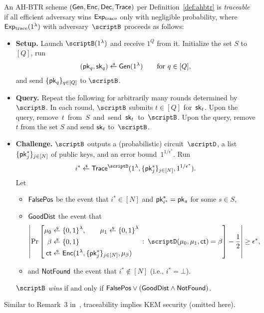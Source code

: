 \begin{definition}[traceability]\label{def:tracing-security}
An AH-BTR scheme $(\Gen,\Enc,\Dec,\Trace)$ per Definition~\ref{def:ahbtr} is \emph{traceable}
if all efficient adversary wins $\ExpTrace$ only with negligible probability,
where $\ExpTrace(1^\lambda)$ with adversary~$\scriptB$ proceeds as follows:
\begin{itemize}\upshape
\item\textbf{Setup.}
Launch $\scriptB(1^\lambda)$ and receive $1^Q$ from it.
Initialize the set $S$ to $[Q]$, run
\begin{align*}
(\pk_q,\sk_q)\draws\Gen(1^\lambda)\qquad\textup{for }q\in[Q],
\end{align*}
and send $\{\pk_q\}_{q\in[Q]}$ to $\scriptB$.
\item\textbf{Query.}
Repeat the following for arbitrarily many rounds determined by~$\scriptB$.
In each round, $\scriptB$ submits ${t\in[Q]}$ for~$\sk_t$.
\WideNarrow
{Upon the query, remove~$t$~from~$S$~and~send~$\sk_t$~to~$\scriptB$.}
{Upon the query, remove $t$ from the set $S$ and send $\sk_t$ to~$\scriptB$.}
\item\textbf{Challenge.}
$\scriptB$ outputs a (probabilistic) circuit~$\scriptD$,
a list $\{\pk^\ast_j\}_{j\in[N]}$ of public keys, and
an error bound~$1^{1/\epsilon^\ast}$.
Run
\begin{align*}
i^\ast\draws\Trace^\scriptD(1^\lambda,\{\pk^\ast_j\}_{j\in[N]},1^{1/\epsilon^\ast}).
\end{align*}
Let
\begin{itemize}
\item $\FalsePos$ be the event that ${i^\ast\in[N]}$ and ${\pk^\ast_{i^\ast}=\pk_s}$ for some ${s\in S}$,
\item $\GoodDist$ the event that
\begin{align*}
\left|\Pr\left[
\begin{aligned}
\mu_0&{}\draws\bit^\lambda,\qquad
\mu_1\draws\bit^\lambda\\
\beta&{}\draws\bit\\
\ct&{}\draws\Enc(1^\lambda,\{\pk^\ast_j\}_{j\in[N]},\mu_\beta)
\end{aligned}
\::\:
\scriptD(\mu_0,\mu_1,\ct)=\beta
\right]-\frac12
\right|
\geq\epsilon^\ast,
\end{align*}
\item and
$\NotFound$ the event that ${i^\ast\notin[N]}$ (i.e., ${i^\ast=\bot}$).
\end{itemize}
$\scriptB$ \emph{wins} if and only if ${\FalsePos\vee(\GoodDist\wedge\NotFound)}$.
\end{itemize}
\end{definition}

\noindent
Similar to Remark~3 in~\cite{EPRINT:Zhandry20a},
traceability implies KEM security (omitted here).

